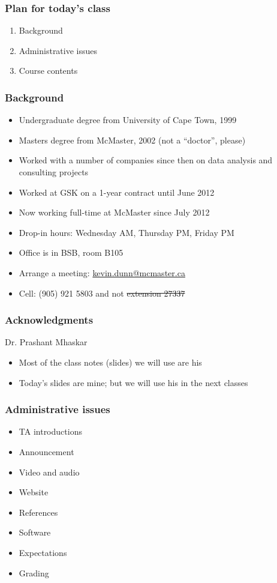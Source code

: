 \begin{frame}\frametitle{Plan for today's class}
	\begin{enumerate}
		\item	Background 
		\item	Administrative issues 
		\item	Course contents 
	\end{enumerate}
\end{frame}

\begin{frame}\frametitle{Background}
	{\color{myGreen}{About myself}}
	\begin{itemize}
		\item	Undergraduate degree from University of Cape Town, 1999
		\item	Masters degree from McMaster, 2002 (not a ``doctor'', please)
		\item	Worked with a number of companies since then on data analysis and consulting projects
		\item	Worked at GSK on a 1-year contract until June 2012
		\item	Now working full-time at McMaster since July 2012
		\item	Drop-in hours: Wednesday AM, Thursday PM, Friday PM
		\item	Office is in BSB, room B105
		\item	Arrange a meeting: \url{kevin.dunn@mcmaster.ca}
		\item	Cell: (905) 921 5803 and not \sout{extension 27337}
	\end{itemize}	
\end{frame}

\begin{frame}\frametitle{Acknowledgments}
	Dr. Prashant Mhaskar
	\begin{itemize}
		\item	Most of the class notes (slides) we will use are his
		\item	Today's slides are mine; but we will use his in the next classes
	\end{itemize}
\end{frame}

\begin{frame}\frametitle{Administrative issues}
	\begin{itemize}
		\item	TA introductions 
		\item	Announcement 
		\item	Video and audio 
		\item	Website 
		\item	References 
		\item	Software 
		\item	Expectations 
		\item	Grading 
	\end{itemize}
\end{frame}

